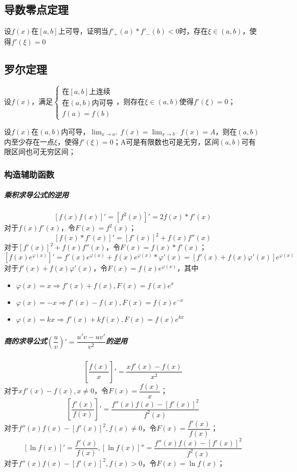 \subsection{导数零点定理}
设\(f(x)\)在\([a, b]\)上可导，证明当\(f'_+(a) * f'_-(b) < 0\)时，存在\(\xi \in (a, b)\)，使得\(f'(\xi) = 0\)


\subsection{罗尔定理}
设\(f(x)\)，满足\(\begin{cases}
\text{在}[a, b]\text{上连续} \\ 
\text{在}(a, b)\text{内可导} \\ 
f(a) = f(b)
\end{cases}\)，则存在\(\xi \in (a, b)\)使得\(f'(\xi) = 0\)；

设\(f(x)\)在\((a, b)\)内可导，\(\displaystyle\lim_{x \to a^+}f(x) = \lim_{x \to b^-}f(x) = A\)，则在\((a, b)\)内至少存在一点\(\xi\)，使得\(f'(\xi) = 0\)；A可是有限数也可是无穷，区间\((a, b)\)可有限区间也可无穷区间；\textbf{}

\subsubsection{构造辅助函数}

\subparagraph{乘积求导公式的逆用}
\[[f(x)f(x)]' = [f^2(x)]' = 2f(x) * f'(x)\]
对于\(f(x)f'(x)\)，令\(F(x) = f^2(x)\)；
\[[f(x) * f'(x)]' = [f'(x)]^2 + f(x)f''(x)\]
对于\([f'(x)]^2 + f(x)f''(x)\)，令\(F(x) = f(x) * f'(x)\)；
\[[f(x)e^{\varphi(x)}]' = f'(x)e^{\varphi(x)} + f(x)e^{\varphi(x)} * \varphi'(x) = [f'(x) + f(x)\varphi'(x)]e^{\varphi(x)}\]
对于\(f'(x) + f(x)\varphi'(x)\)，令\(F(x) = f(x)e^{\varphi(x)}\)，其中\begin{itemize}
    \item \(\varphi(x) = x \Rightarrow f'(x) + f(x), F(x) = f(x)e^x\)
    \item \(\varphi(x) = -x \Rightarrow f'(x) - f(x), F(x) = f(x)e^{-x}\)
    \item \(\varphi(x) = kx \Rightarrow f'(x) + kf(x), F(x) = f(x)e^{kx}\)
\end{itemize}


\subparagraph{商的求导公式\((\dfrac{u}{v})' = \dfrac{u'v - uv'}{v^2}\)的逆用}

\[[\dfrac{f(x)}{x}]' = \dfrac{xf'(x) - f(x)}{x^2}\]
对于\(xf'(x) - f(x), x \neq 0\)，令\(F(x) = \dfrac{f(x)}{x}\)；
\[[\dfrac{f'(x)}{f(x)}]' = \dfrac{f''(x)f(x) - [f'(x)]^2}{f^2(x)}\]
对于\(f''(x)f(x) - [f'(x)]^2, f(x) \neq 0\)，令\(F(x) = \dfrac{f'(x)}{f(x)}\)；
\[[\ln f(x)]' = \dfrac{f'(x)}{f(x)}, [\ln f(x)]'' = \dfrac{f''(x)f(x) - [f'(x)]^2}{f^2(x)}\]
对于\(f''(x)f(x) - [f'(x)]^2, f(x) > 0\)，令\(F(x) = \ln f(x)\)；


